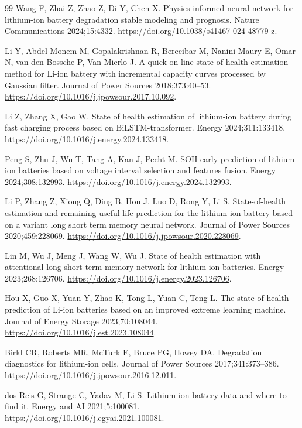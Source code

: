 \begin{thebibliography}{99}
 Wang F, Zhai Z, Zhao Z, Di Y, Chen X. Physics-informed neural network for lithium-ion battery degradation stable modeling and prognosis. Nature Communications 2024;15:4332. \url{https://doi.org/10.1038/s41467-024-48779-z}.

 Li Y, Abdel-Monem M, Gopalakrishnan R, Berecibar M, Nanini-Maury E, Omar N, van den Bossche P, Van Mierlo J. A quick on-line state of health estimation method for Li-ion battery with incremental capacity curves processed by Gaussian filter. Journal of Power Sources 2018;373:40--53. \url{https://doi.org/10.1016/j.jpowsour.2017.10.092}.

 Li Z, Zhang X, Gao W. State of health estimation of lithium-ion battery during fast charging process based on BiLSTM-transformer. Energy 2024;311:133418. \url{https://doi.org/10.1016/j.energy.2024.133418}.

 Peng S, Zhu J, Wu T, Tang A, Kan J, Pecht M. SOH early prediction of lithium-ion batteries based on voltage interval selection and features fusion. Energy 2024;308:132993. \url{https://doi.org/10.1016/j.energy.2024.132993}.

 Li P, Zhang Z, Xiong Q, Ding B, Hou J, Luo D, Rong Y, Li S. State-of-health estimation and remaining useful life prediction for the lithium-ion battery based on a variant long short term memory neural network. Journal of Power Sources 2020;459:228069. \url{https://doi.org/10.1016/j.jpowsour.2020.228069}.

 Lin M, Wu J, Meng J, Wang W, Wu J. State of health estimation with attentional long short-term memory network for lithium-ion batteries. Energy 2023;268:126706. \url{https://doi.org/10.1016/j.energy.2023.126706}.

 Hou X, Guo X, Yuan Y, Zhao K, Tong L, Yuan C, Teng L. The state of health prediction of Li-ion batteries based on an improved extreme learning machine. Journal of Energy Storage 2023;70:108044. \url{https://doi.org/10.1016/j.est.2023.108044}.

 Birkl CR, Roberts MR, McTurk E, Bruce PG, Howey DA. Degradation diagnostics for lithium-ion cells. Journal of Power Sources 2017;341:373–386. \url{https://doi.org/10.1016/j.jpowsour.2016.12.011}.

 dos Reis G, Strange C, Yadav M, Li S. Lithium-ion battery data and where to find it. Energy and AI 2021;5:100081. \url{https://doi.org/10.1016/j.egyai.2021.100081}.


\end{thebibliography}
